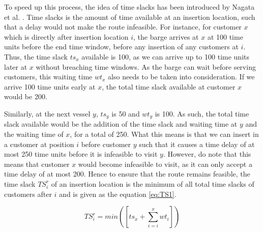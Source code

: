 To speed up this process, the idea of time slacks has been introduced by Nagata et al. \cite{nagata_penalty-based_2010}. Time slacks is the amount of time available at an insertion location, such that a delay would not make the route infeasible. For instance, for customer $x$ which is directly after insertion location $i$, the barge arrives at $x$ at 100 time units before the end time window, before any insertion of any customers at $i$. Thus, the time slack $ts_{x}$ available is 100, as we can arrive up to 100 time units later at $x$ without breaching time windows. As the barge can wait before serving customers, this waiting time $wt_{x}$ also needs to be taken into consideration. If we arrive 100 time units early at $x$, the total time slack available at customer $x$ would be 200. 

Similarly, at the next vessel $y$, $ts_{y}$ is 50 and $wt_{y}$ is 100. As such, the total time slack available would be the addition of the time slack and waiting time at $y$ and the waiting time of $x$, for a total of 250. What this means is that we can insert in a customer at position $i$ before customer $y$ such that it causes a time delay of at most 250 time units before it is infeasible to visit $y$. However, do note that this means that customer $x$ would become infeasible to visit, as it can only accept a time delay of at most 200. Hence to ensure that the route remains feasible, the time slack $TS_{i}^{r}$ of an insertion location is the minimum of all total time slacks of customers after $i$ and is given as the equation \ref{eq:TS1}.

\begin{comment}
However, if at the next vessel $y$, there is a time slack of 50 time units, $ts_{i}$ should be updated to 50, as that is the maximum time delay, such that both vessels $x, y$ after the insertion point can still be visited.

As the barge can wait before serving customers, For instance, we arrive 100 time units early at both customer $x,y$ before insertion of any customers at $i$ we have to add 100 time units to the time slack at $x$ and 200 time units to the time slack at $y$, for a total time slack of 200 and 250 time slacks at $x,y$ respectively. As such, the maximum time delay such that both $x,y$ can be visited is 200. Time slack $TS_{r}$ at an insertion location $i$ is given by equation \ref{eq:TS1}
\end{comment}
\begin{equation}\label{eq:TS1}
TS_{i}^{r} = min([ts_{x} + \sum_{i=i}^{x} wt_{i}])
\end{equation}

